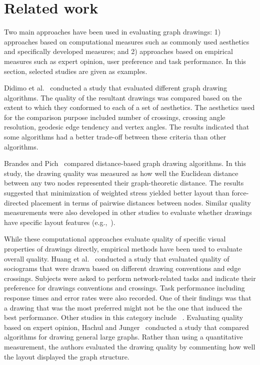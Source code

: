 \documentclass[conference,letterpaper]{IEEEtran}
\begin{document}
\section{Related work} \label{sec:related}

Two main approaches have been used in evaluating graph drawings: 1) approaches based on computational measures such as commonly used aesthetics and specifically developed measures; and 2) approaches based on empirical measures such as expert opinion, user preference and task performance. In this section, selected studies are given as examples. 

Didimo et al.~\cite{didimo} conducted a study that evaluated different graph drawing algorithms. The quality of the resultant drawings was compared based on the extent to which they conformed to each of a set of aesthetics. The aesthetics used for the comparison purpose included number of crossings, crossing angle resolution, geodesic edge tendency and vertex angles. The results indicated that some algorithms had a better trade-off between these criteria than other algorithms. 

Brandes and Pich~\cite{brandes08} compared distance-based graph drawing algorithms. In this study, the drawing quality was measured as how well the Euclidean distance between any two nodes represented their graph-theoretic distance. The results suggested that minimization of weighted stress yielded better layout than force-directed placement in terms of pairwise distances between nodes. Similar quality measurements were also developed in other studies to evaluate whether drawings have specific layout features (e.g.,~\cite{zai}). 

While these computational approaches evaluate quality of specific visual properties of drawings directly, empirical methods have been used to evaluate overall quality. Huang et al.~\cite{huang05} conducted a study that evaluated quality of sociograms that were drawn based on different drawing conventions and edge crossings. Subjects were asked to perform  network-related tasks and indicate their preference for drawings conventions and crossings. Task performance including response times and error rates were also recorded. One of their findings was that a drawing that was the most preferred might not be the one that induced the best performance. Other studies in this category include ~\cite{arch12a,korner02,dwyer09}. Evaluating quality based on expert opinion, Hachul and Junger~\cite{hac} conducted a study that compared algorithms for drawing general large graphs. Rather than using a quantitative measurement, the authors evaluated the drawing quality by commenting how well the layout displayed the graph structure. 
\end{document}
